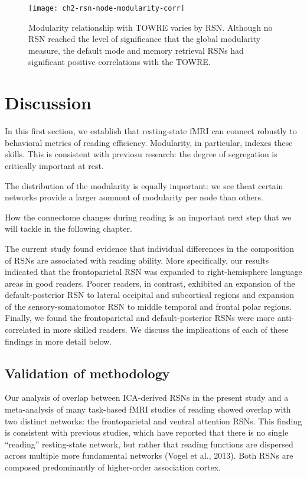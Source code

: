 \begin{figure}[t]
    \centering
    \texttt{[image: ch2-rsn-node-modularity-corr]}
    \caption[Modularity relationship with TOWRE varies by RSN.] {Modularity relationship with TOWRE varies by RSN. Although no RSN reached the level of significance that the global modularity measure, the default mode and memory retrieval RSNs had significant positive correlations with the TOWRE.}
    \label{fig:ch2-rsn-node-modularity-corr}
\end{figure}

\section{Discussion}

In this first section, we establish that resting-state fMRI can connect robustly to behavioral metrics of reading efficiency. Modularity, in particular, indexes these skills. This is consistent with previosu research: the degree of segregation is critically important at rest. 

The distribution of the modularity is equally important: we see theat certain networks provide a larger aomuont of modularity per node than others. 

How the connectome changes during reading is an important next step that we will tackle in the following chapter.

The current study found evidence that individual differences in the composition of RSNs are associated with reading ability.  More specifically, our results indicated that the frontoparietal RSN was expanded to right-hemisphere language areas in good readers. Poorer readers, in contrast, exhibited an expansion of the default-posterior RSN to lateral occipital and subcortical regions and expansion of the sensory-somatomotor RSN to middle temporal and frontal polar regions. Finally, we found the frontoparietal and default-posterior RSNs were more anti-correlated in more skilled readers.  We discuss the implications of each of these findings in more detail below.

\subsection{Validation of methodology}

Our analysis of overlap between ICA-derived RSNs in the present study and a meta-analysis of many task-based fMRI studies of reading showed overlap with two distinct networks: the frontoparietal and ventral attention RSNs.  This finding is consistent with previous studies, which have reported that there is no single “reading” resting-state network, but rather that reading functions are dispersed across multiple more fundamental networks (Vogel et al., 2013). Both RSNs are composed predominantly of higher-order association cortex.  

